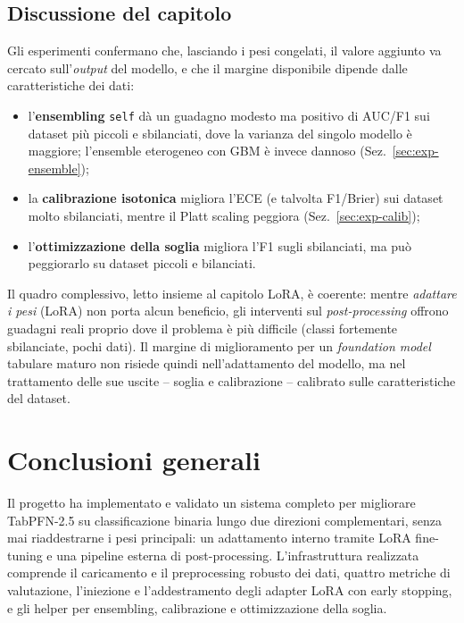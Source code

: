 \documentclass[11pt,a4paper]{article}
\begin{document}
\subsection{Discussione del capitolo}
\label{sec:pipeline-discussione}
Gli esperimenti confermano che, lasciando i pesi congelati, il valore aggiunto va
cercato sull'\emph{output} del modello, e che il margine disponibile dipende dalle
caratteristiche dei dati:
\begin{itemize}[nosep]
  \item l'\textbf{ensembling} \texttt{self} dà un guadagno modesto ma
  positivo di AUC/F1 sui dataset più piccoli e sbilanciati, dove la varianza del
  singolo modello è maggiore; l'ensemble eterogeneo con GBM è invece dannoso
  (Sez.~\ref{sec:exp-ensemble});
  \item la \textbf{calibrazione isotonica} migliora l'ECE (e talvolta F1/Brier)
  sui dataset molto sbilanciati, mentre il Platt scaling peggiora
  (Sez.~\ref{sec:exp-calib});
  \item l'\textbf{ottimizzazione della soglia} migliora l'F1 sugli sbilanciati,
  ma può peggiorarlo su dataset piccoli e bilanciati.
\end{itemize}
Il quadro complessivo, letto insieme al capitolo LoRA, è coerente: mentre
\emph{adattare i pesi} (LoRA) non porta alcun beneficio, gli interventi sul
\emph{post-processing} offrono guadagni reali proprio dove il problema è più
difficile (classi fortemente sbilanciate, pochi dati). Il margine di
miglioramento per un \emph{foundation model} tabulare maturo non risiede quindi
nell'adattamento del modello, ma nel trattamento delle sue uscite -- soglia e
calibrazione -- calibrato sulle caratteristiche del dataset.

\section{Conclusioni generali}
\label{sec:conclusioni}
Il progetto ha implementato e validato un sistema completo per migliorare
TabPFN-2.5 su classificazione binaria lungo due direzioni complementari, senza
mai riaddestrarne i pesi principali: un adattamento interno tramite LoRA
fine-tuning e una pipeline esterna di post-processing. L'infrastruttura
realizzata comprende il caricamento e il preprocessing robusto dei dati, quattro
metriche di valutazione, l'iniezione e l'addestramento degli adapter LoRA con
early stopping, e gli helper per ensembling, calibrazione e ottimizzazione della
soglia.
\end{document}
